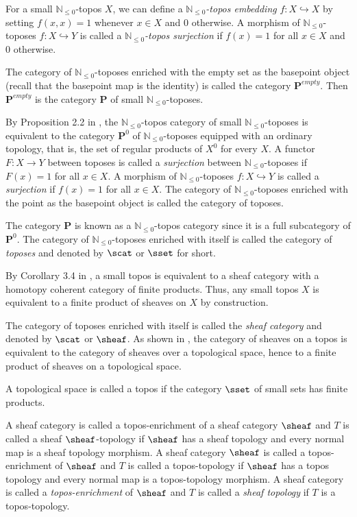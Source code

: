 \documentclass[a4paper,reqno,oneside]{article}
\begin{document}
For a small $\mathbb{N}_{\leq0}$-topos $X$, we can define a \textit{$\mathbb{N}_{\leq0}$-topos embedding} $f:X\hookrightarrow X$ by setting $f(x,x)=1$ whenever $x\in X$ and 0 otherwise. A morphism of $\mathbb{N}_{\leq0}$-toposes $f:X\hookrightarrow Y$ is called a \textit{$\mathbb{N}_{\leq0}$-topos surjection} if $f(x)=1$ for all $x\in X$ and 0 otherwise.


The category of $\mathbb{N}_{\leq0}$-toposes enriched with the empty set as the basepoint object (recall that the basepoint map is the identity) is called the category $\mathbf{P}^{empty}$. Then $\mathbf{P}^{empty}$ is the category $\mathbf{P}$ of small $\mathbb{N}_{\leq0}$-toposes. 

By Proposition 2.2 in \cite{DubucReitberg2012}, the $\mathbb{N}_{\leq0}$-topos category of small $\mathbb{N}_{\leq0}$-toposes is equivalent to the category $\mathbf{P}^{0}$ of $\mathbb{N}_{\leq0}$-toposes equipped with an ordinary topology, that is, the set of regular products of $X^0$ for every $X$. A functor $F:X\to Y$ between toposes is called a \textit{surjection} between $\mathbb{N}_{\leq0}$-toposes if $F(x)=1$ for all $x\in X$. A morphism of $\mathbb{N}_{\leq0}$-toposes $f:X\hookrightarrow Y$ is called a \textit{surjection} if $f(x)=1$ for all $x\in X$. The category of $\mathbb{N}_{\leq0}$-toposes enriched with the point as the basepoint object is called the category of toposes.

The category $\mathbf{P}$ is known as a $\mathbb{N}_{\leq0}$-topos category since it is a full subcategory of $\mathbf{P}^{0}$. The category of $\mathbb{N}_{\leq0}$-toposes enriched with itself is called the category of \textit{toposes} and denoted by $\scat$ or $\sset$ for short. 

By Corollary 3.4 in \cite{Savage2017}, a small topos is equivalent to a sheaf category with a homotopy coherent category of finite products. Thus, any small topos $X$ is equivalent to a finite product of sheaves on $X$ by construction. 

The category of toposes enriched with itself is called the \textit{sheaf category} and denoted by $\scat$ or $\sheaf$. As shown in \cite{Savage2017}, the category of sheaves on a topos is equivalent to the category of sheaves over a topological space, hence to a finite product of sheaves on a topological space. 

A topological space is called a topos if the category $\sset$ of small sets has finite products. 

A sheaf category is called a topos-enrichment of a sheaf category $\sheaf$ and $T$ is called a sheaf $\sheaf$-topology if $\sheaf$ has a sheaf topology and every normal map is a sheaf topology morphism. A sheaf category $\sheaf$ is called a topos-enrichment of $\sheaf$ and $T$ is called a topos-topology if $\sheaf$ has a topos topology and every normal map is a topos-topology morphism. A sheaf category is called a \textit{topos-enrichment} of $\sheaf$ and $T$ is called a \textit{sheaf topology} if $T$ is a topos-topology.  
\end{document}
